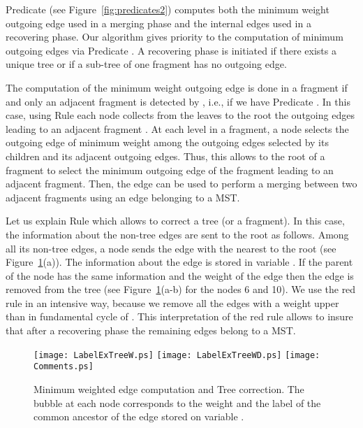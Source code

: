 \documentclass[11pt,a4paper]{article}
\begin{document}
Predicate  (see Figure~\ref{fig:predicates2}) computes both the minimum weight outgoing edge used in a merging phase and the internal edges used in a recovering phase. Our algorithm gives priority to the computation of minimum outgoing edges via Predicate . A recovering phase is initiated if there exists a unique tree or if a sub-tree of one fragment has no outgoing edge.




The computation of the minimum weight outgoing edge is done in a fragment  if and only an adjacent fragment  is detected by , i.e., if we have Predicate . In this case, using Rule  each node collects from the leaves to the root the outgoing edges leading to an adjacent fragment . At each level in a fragment, a node selects the outgoing edge of minimum weight among the outgoing edges selected by its children and its adjacent outgoing edges. Thus, this allows to the root of a fragment to select the minimum outgoing edge  of the fragment leading to an adjacent fragment. Then, the edge  can be used to perform a merging between two adjacent fragments using an edge belonging to a MST.



Let us explain Rule  which allows to correct a tree (or a fragment). 
In this case, the information about the non-tree edges are sent to the
root as follows. 
Among all its non-tree edges, a node  sends the edge  with the  nearest to the root (see Figure~\ref{fig:min}(a)).
The information about the edge  is stored in variable .
If the parent  of the node  has the same information and  the
weight of the edge  then 
the edge  is removed from the tree (see Figure~\ref{fig:min}(a-b) for the nodes 6 and 10).
We use the red rule in an intensive way, because we remove all the edges with a weight upper than  in fundamental cycle of . 
This interpretation of the red rule allows to insure that after a recovering phase the remaining edges belong to a MST.

\begin{figure}[htbp]
\begin{center}
\texttt{[image: LabelExTreeW.ps]}
\texttt{[image: LabelExTreeWD.ps]}
\texttt{[image: Comments.ps]}
\caption{Minimum weighted edge computation and Tree correction. The bubble at each node  corresponds to the weight and the label of the common ancestor of the edge stored on variable .}
\label{fig:min}
\end{center}
\end{figure}
\end{document}
